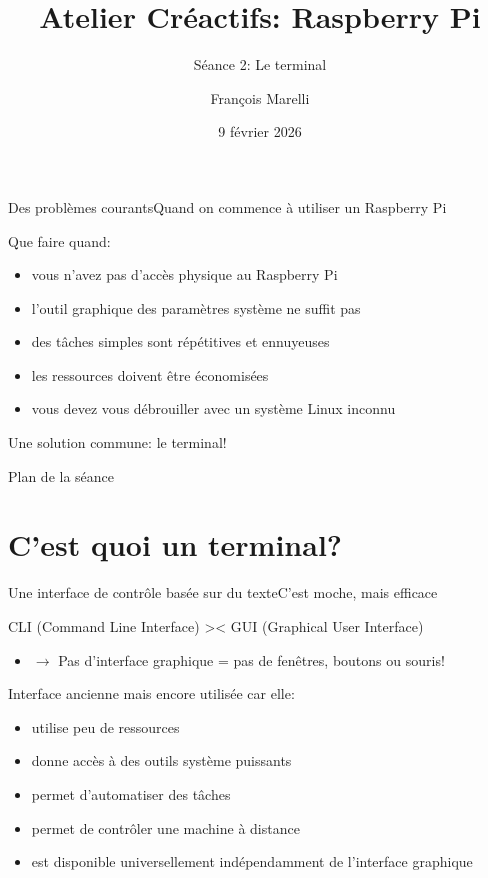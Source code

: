 \documentclass[
aspectratio=169 %
]{beamer}
\author[F. Marelli]{François Marelli}
\affiliation[UMONS]{UMONS, ISIA Lab}
\title{Atelier Créactifs: Raspberry Pi}
\subtitle{Séance 2: Le terminal}
\date{9 février 2026}
\begin{document}
\maketitle

\begin{frame}{Des problèmes courants}{Quand on commence à utiliser un Raspberry
        Pi}

    Que faire quand:
    \begin{itemize}
        \item vous n'avez pas d'accès physique au Raspberry Pi
        \item l'outil graphique des paramètres système ne suffit pas
        \item des tâches simples sont répétitives et ennuyeuses
        \item les ressources doivent être économisées
        \item vous devez vous débrouiller avec un système Linux inconnu
    \end{itemize}

    \bigskip Une solution commune: \alert{le terminal!
    }
\end{frame}

\begin{frame}{Plan de la séance}
    \tableofcontents
\end{frame}

\section{C'est quoi un terminal?}
\frame{\sectionpage}

\begin{frame}{Une interface de contrôle basée sur du texte}{C'est moche, mais
        efficace}

    CLI (Command Line Interface) >< GUI (Graphical User Interface)
    \begin{itemize}
        \item \(\rightarrow\) Pas d'interface graphique = pas de fenêtres,
              boutons ou souris!
    \end{itemize}

    \bigskip

    Interface ancienne mais encore utilisée car elle:

    \begin{itemize}
        \item utilise peu de ressources
        \item donne accès à des outils système puissants
        \item permet d'automatiser des tâches
        \item permet de contrôler une machine à distance
        \item est disponible universellement indépendamment de l'interface
              graphique
    \end{itemize}
\end{frame}
\end{document}
